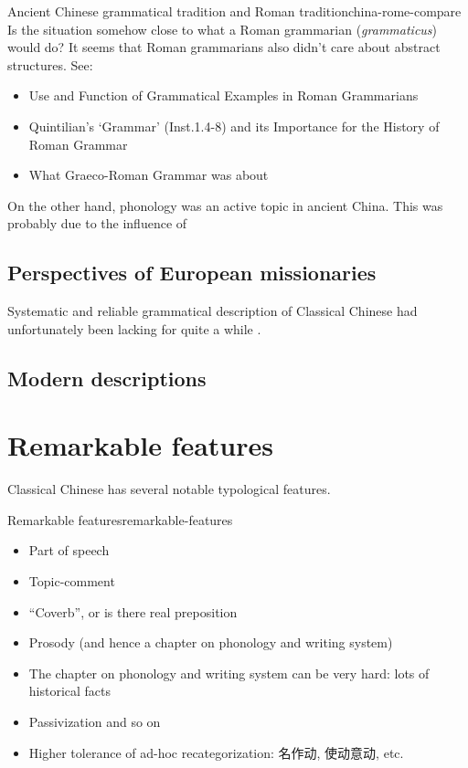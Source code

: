 \documentclass[UTF8, a4paper, oneside, scheme=plain, 12pt]{ctexrep}
\newcommand*{\citepage}[1]{p.~{#1}}
\newcommand{\form}[1]{\emph{#1}}
\begin{document}
\begin{todobox}{Ancient Chinese grammatical tradition and Roman tradition}{china-rome-compare}
    Is the situation somehow close to what a Roman grammarian (\form{grammaticus}) would do?
    It seems that Roman grammarians also didn't care about abstract structures.
    See:
    \begin{itemize}
        \item Use and Function of Grammatical Examples in Roman Grammarians
        \item Quintilian’s ‘Grammar’ (Inst.1.4-8) and its Importance for the History of Roman Grammar
        \item What Graeco-Roman Grammar was about
    \end{itemize}
\end{todobox}

On the other hand, phonology was an active topic in ancient China.
This was probably due to the influence of 

\subsection{Perspectives of European missionaries}

Systematic and reliable grammatical description of Classical Chinese had unfortunately been lacking for quite a while \citep[\citepage{xiii}]{pulleyblank1995outline}.

\subsection{Modern descriptions}\label{sec:introduction.previous.modern}



\section{Remarkable features}

Classical Chinese has several notable typological features.

\begin{todobox}{Remarkable features}{remarkable-features}
    \begin{itemize}
        \item Part of speech
        \item Topic-comment
        \item ``Coverb'', or is there real preposition
        \item Prosody (and hence a chapter on phonology and writing system)
        \item The chapter on phonology and writing system can be very hard:
            lots of historical facts
        \item Passivization and so on
        \item Higher tolerance of ad-hoc recategorization: 名作动, 使动意动, etc.
    \end{itemize}
\end{todobox}
\end{document}
